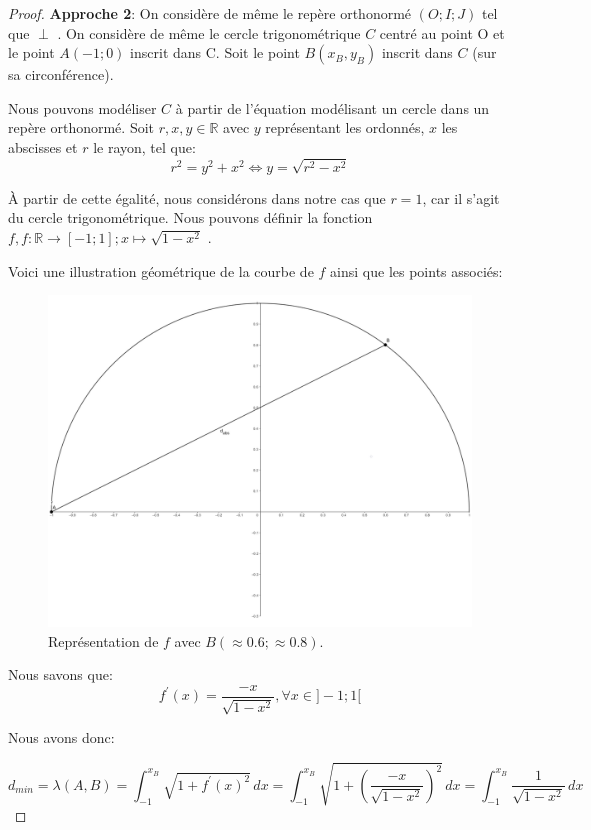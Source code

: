 \documentclass[a4paper]{amsart}
\theoremstyle{definition}
\theoremstyle{remark}
\numberwithin{equation}{section}
\renewcommand*{\overrightarrow}[1]{\vbox{\halign{##\cr 
  \tiny\rightarrowfill\cr\noalign{\nointerlineskip\vskip1pt} 
  $#1\mskip2mu$\cr}}}
\begin{document}
\begin{proof}
  \textbf{Approche 2}: On considère de même le repère orthonormé $(O;I;J)$ tel que \overrightarrow{OI} $\perp$ \overrightarrow{OJ}. On considère de même le cercle trigonométrique $C$ centré au point O et le point $A(-1;0)$ inscrit dans C. Soit le point
  $B(x_B,y_B)$ inscrit dans $C$ (sur sa circonférence).

  Nous pouvons modéliser $C$ à partir de l'équation modélisant un cercle dans un repère orthonormé. Soit $r,x,y\in\mathbb{R}$ avec $y$ représentant les ordonnés, $x$ les abscisses et $r$ le rayon, tel que:
  \[r^2=y^2+x^2 \Leftrightarrow  y = \sqrt{r^2-x^2}\]

  À partir de cette égalité, nous considérons dans notre cas que $r=1$, car il s'agit du cercle trigonométrique. Nous pouvons définir la fonction $f,f:\mathbb{R}\longrightarrow [-1;1];  x\longmapsto \sqrt{1-x^2}$ .

  Voici une illustration géométrique de la courbe de $f$ ainsi que les points associés:

  \begin{figure}[H]
    \centering
    \includegraphics[scale=0.1]{images/angle_function.png}
    \caption{Représentation de $f$ avec $B(\approx0.6;\approx0.8)$.}
  \end{figure}

  Nous savons que: \[f^\prime(x)=\frac{-x}{\sqrt{1-x^2}}, \forall x\in]-1;1[\]

  Nous avons donc:

  \[d_{min}=\lambda(A,B)=\int_{-1}^{x_B} \sqrt{1+{f^\prime}(x)^2} \,dx=\int_{-1}^{x_B} \sqrt{1+(\frac{-x}{\sqrt{1-x^2}})^2}\,dx=\int_{-1}^{x_B} \frac{1}{\sqrt{1-x^2}}\,dx\]


\end{proof}
\end{document}
